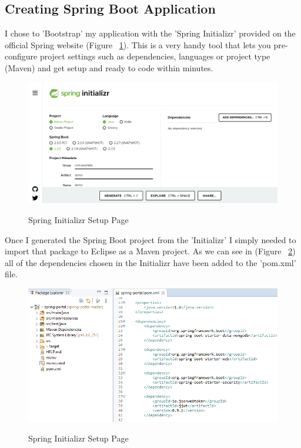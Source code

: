 \subsection{Creating Spring Boot Application}
I chose to 'Bootstrap' my application with the 'Spring Initializr' provided on the official Spring website (Figure ~\ref{spring1_label}). This is a very handy tool that lets you pre-configure project settings such as dependencies, languages or project type (Maven) and get setup and ready to code within minutes.

\begin{figure}[ht]
    \centering
    \includegraphics[scale=0.35]{Images/spring1.png} 
    \label{spring1_label}
    \caption{Spring Initializr Setup Page}
\end{figure}
Once I generated the Spring Boot project from the 'Initializr' I simply needed to import that package to Eclipse as a Maven project. As we can see in (Figure ~\ref{spring2_label}) all of the dependencies chosen in the Initializr have been added to the 'pom.xml' file.

\begin{figure}[ht]
    \centering
    \includegraphics[scale=0.33]{Images/spring2.png} 
    \label{spring2_label}
    \caption{Spring Initializr Setup Page}
\end{figure}

